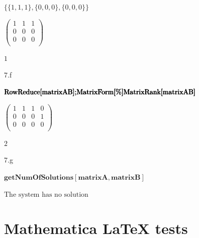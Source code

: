 \documentclass[11pt,a4paper]{article}
\begin{document}
\begin{doublespace}
\noindent\(\{\{1,1,1\},\{0,0,0\},\{0,0,0\}\}\)
\end{doublespace}

\begin{doublespace}
\noindent\(\left(
\begin{array}{ccc}
 1 & 1 & 1 \\
 0 & 0 & 0 \\
 0 & 0 & 0 \\
\end{array}
\right)\)
\end{doublespace}

\begin{doublespace}
\noindent\(1\)
\end{doublespace}

7.f\\
\begin{doublespace}
\noindent\(\pmb{\text{RowReduce}[\text{matrixAB}];}\\
\pmb{\text{MatrixForm}[\%]}\\
\pmb{\text{MatrixRank}[\text{matrixAB}]}\)
\end{doublespace}

\begin{doublespace}
\noindent\(\left(
\begin{array}{cccc}
 1 & 1 & 1 & 0 \\
 0 & 0 & 0 & 1 \\
 0 & 0 & 0 & 0 \\
\end{array}
\right)\)
\end{doublespace}

\begin{doublespace}
\noindent\(2\)
\end{doublespace}


7.g\\
\begin{doublespace}
\noindent\(\pmb{\text{getNumOfSolutions}[\text{matrixA},\text{matrixB}]}\)
\end{doublespace}

\noindent\(\text{The system has no solution}\)

\clearpage
\section{Mathematica LaTeX tests}\label{sec:P08}



\clearpage

\printbibliography

\end{document}
